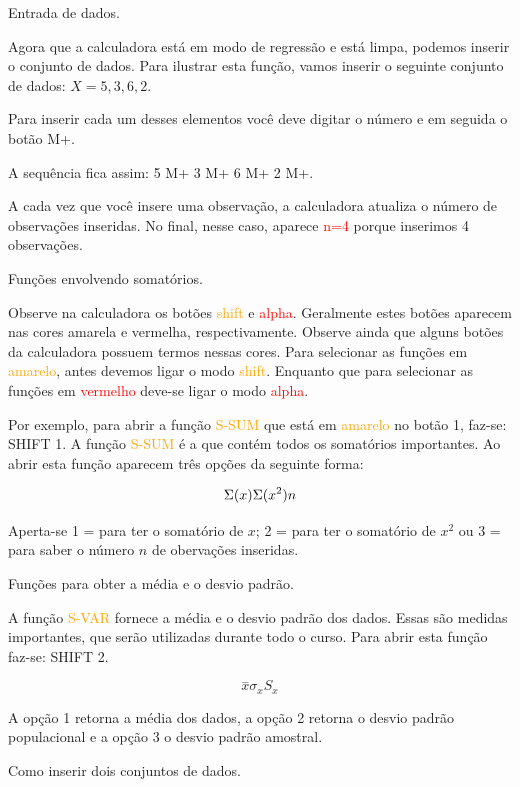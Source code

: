 \documentclass[
]{book}
\begin{document}
Entrada de dados.

Agora que a calculadora está em modo de regressão e está limpa, podemos inserir o conjunto de dados. Para ilustrar esta função, vamos inserir o seguinte conjunto de dados: \(X= {5,3,6,2}\).

Para inserir cada um desses elementos você deve digitar o número e em seguida o botão M+.

A sequência fica assim: 5 M+ 3 M+ 6 M+ 2 M+.

A cada vez que você insere uma observação, a calculadora atualiza o número de observações inseridas. No final, nesse caso, aparece \textcolor{red}{n=4} porque inserimos 4 observações.

Funções envolvendo somatórios.

Observe na calculadora os botões \textcolor{orange}{shift} e \textcolor{red}{alpha}. Geralmente estes botões aparecem nas cores amarela e vermelha, respectivamente. Observe ainda que alguns botões da calculadora possuem termos nessas cores. Para selecionar as funções em \textcolor{orange}{amarelo}, antes devemos ligar o modo \textcolor{orange}{shift}. Enquanto que para selecionar as funções em \textcolor{red}{vermelho} deve-se ligar o modo \textcolor{red}{alpha}.

Por exemplo, para abrir a função \textcolor{orange}{S-SUM} que está em \textcolor{orange}{amarelo} no botão 1, faz-se: SHIFT 1. A função \textcolor{orange}{S-SUM} é a que contém todos os somatórios importantes. Ao abrir esta função aparecem três opções da seguinte forma:

\[
\Sigma(x) \\
\Sigma(x^{2})\\
n 
\]

Aperta-se 1 = para ter o somatório de \(x\); 2 = para ter o somatório de \(x^{2}\) ou 3 = para saber o número \(n\) de obervações inseridas.

Funções para obter a média e o desvio padrão.

A função \textcolor{orange}{S-VAR} fornece a média e o desvio padrão dos dados. Essas são medidas importantes, que serão utilizadas durante todo o curso. Para abrir esta função faz-se: SHIFT 2.

\[
\stackrel{-}{x}
\sigma_{x}
S_{x}
\]

A opção 1 retorna a média dos dados, a opção 2 retorna o desvio padrão populacional e a opção 3 o desvio padrão amostral.

Como inserir dois conjuntos de dados.
\end{document}
